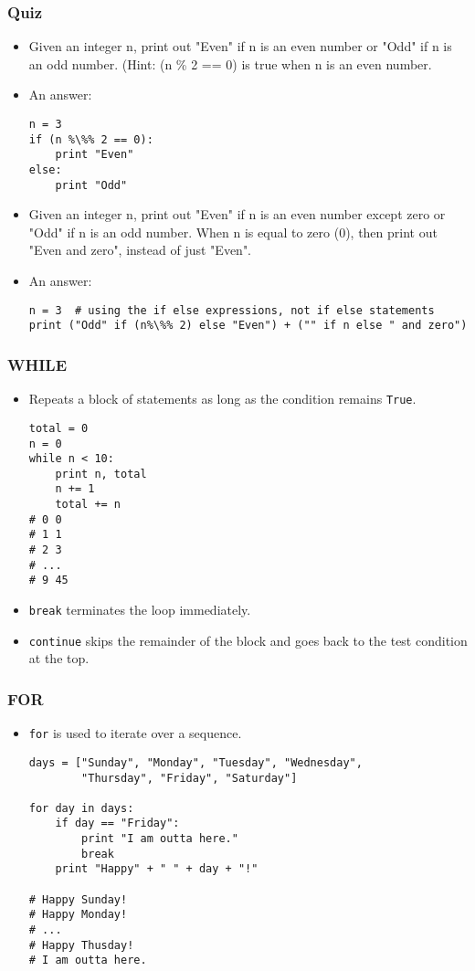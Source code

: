 \documentclass{beamer}
\begin{document}
\begin{frame}[fragile]
\frametitle{Quiz}
\begin{itemize}
\item Given an integer n, print out "Even" if n is an
    even number or "Odd" if n is an odd number. (Hint:
    (n \% 2 == 0) is true when n is an even number.
\item An answer:
\begin{lstlisting}[escapechar=\%]
n = 3
if (n %\%% 2 == 0):
    print "Even"
else:
    print "Odd"
\end{lstlisting}
\item Given an integer n, print out "Even" if n is an
    even number except zero or "Odd" if n is an odd number.
    When n is equal to zero (0), then print out "Even and zero",
    instead of just "Even".
\item An answer:
\begin{lstlisting}[escapechar=\%]
n = 3  # using the if else expressions, not if else statements
print ("Odd" if (n%\%% 2) else "Even") + ("" if n else " and zero")
\end{lstlisting}
\end{itemize}
\end{frame}

\begin{frame}[fragile]
\frametitle{WHILE}
\begin{itemize}
\item Repeats a block of statements
      as long as the condition remains \lstinline{True}.
\begin{lstlisting}
total = 0
n = 0
while n < 10:
    print n, total
    n += 1
    total += n
# 0 0
# 1 1
# 2 3
# ...
# 9 45
\end{lstlisting}
\item \lstinline{break} terminates the loop
      immediately.
\item \lstinline{continue} skips the remainder
      of the block and goes back to the test 
      condition at the top.
\end{itemize}
\end{frame}

\begin{frame}[fragile]
\frametitle{FOR}
\begin{itemize}
\item \lstinline{for} is used to iterate over a
      sequence.
\begin{lstlisting}
days = ["Sunday", "Monday", "Tuesday", "Wednesday",
        "Thursday", "Friday", "Saturday"]

for day in days:
    if day == "Friday":
        print "I am outta here."
        break
    print "Happy" + " " + day + "!"

# Happy Sunday!
# Happy Monday!
# ...
# Happy Thusday!
# I am outta here.
\end{lstlisting}
\end{itemize}
\end{frame}
\end{document}
